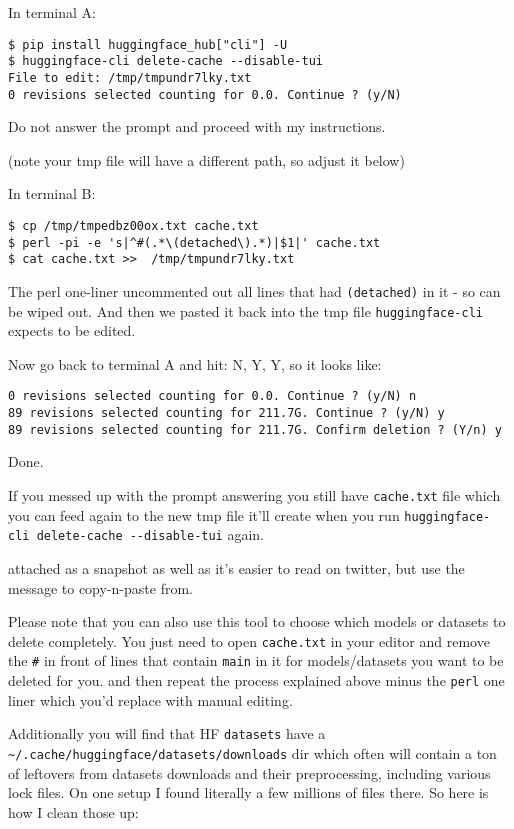 \documentclass[
]{report}
\begin{document}
In terminal A:

\begin{verbatim}
$ pip install huggingface_hub["cli"] -U
$ huggingface-cli delete-cache --disable-tui
File to edit: /tmp/tmpundr7lky.txt
0 revisions selected counting for 0.0. Continue ? (y/N)
\end{verbatim}

Do not answer the prompt and proceed with my instructions.

(note your tmp file will have a different path, so adjust it below)

In terminal B:

\begin{verbatim}
$ cp /tmp/tmpedbz00ox.txt cache.txt
$ perl -pi -e 's|^#(.*\(detached\).*)|$1|' cache.txt
$ cat cache.txt >>  /tmp/tmpundr7lky.txt
\end{verbatim}

The perl one-liner uncommented out all lines that had
\texttt{(detached)} in it - so can be wiped out. And then we pasted it
back into the tmp file \texttt{huggingface-cli} expects to be edited.

Now go back to terminal A and hit: N, Y, Y, so it looks like:

\begin{verbatim}
0 revisions selected counting for 0.0. Continue ? (y/N) n
89 revisions selected counting for 211.7G. Continue ? (y/N) y
89 revisions selected counting for 211.7G. Confirm deletion ? (Y/n) y
\end{verbatim}

Done.

If you messed up with the prompt answering you still have
\texttt{cache.txt} file which you can feed again to the new tmp file
it'll create when you run
\texttt{huggingface-cli\ delete-cache\ -\/-disable-tui} again.

attached as a snapshot as well as it's easier to read on twitter, but
use the message to copy-n-paste from.

Please note that you can also use this tool to choose which models or
datasets to delete completely. You just need to open \texttt{cache.txt}
in your editor and remove the \texttt{\#} in front of lines that contain
\texttt{main} in it for models/datasets you want to be deleted for you.
and then repeat the process explained above minus the \texttt{perl} one
liner which you'd replace with manual editing.

Additionally you will find that HF \texttt{datasets} have a
\texttt{\textasciitilde{}/.cache/huggingface/datasets/downloads} dir
which often will contain a ton of leftovers from datasets downloads and
their preprocessing, including various lock files. On one setup I found
literally a few millions of files there. So here is how I clean those
up:
\end{document}
